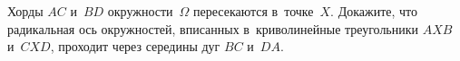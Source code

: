 \begin{problems}

\item
Хорды $AC$ и~$BD$ окружности~$\Omega$ пересекаются в~точке~$X$.
Докажите, что радикальная ось окружностей, вписанных в~криволинейные
треугольники $AXB$ и~$CXD$, проходит через середины дуг $BC$ и~$DA$.

\end{problems}

